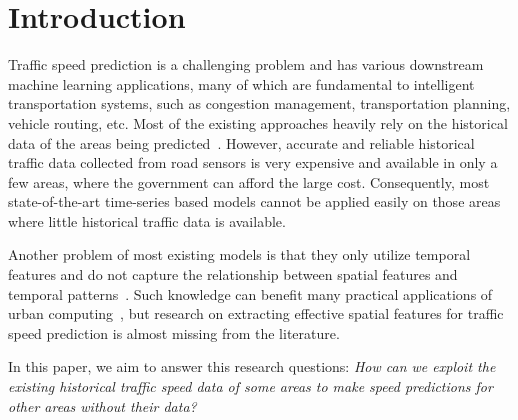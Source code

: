 \section{Introduction}
Traffic speed prediction is a challenging problem and has various downstream machine learning applications, many of which are fundamental to intelligent transportation systems, such as
congestion management, transportation planning,  vehicle routing, etc. \cite{Pan2012, Xu2015,Mchugh2015}
Most of the existing approaches heavily rely on the historical data of the areas being predicted~\cite{Ren2014,Clark2003Traffic}.
However, accurate and reliable historical traffic data collected from road sensors is very expensive and available in only a few areas, where the government can afford the large cost.
Consequently, most state-of-the-art time-series based models cannot be applied easily on those areas where little historical traffic data is available.

Another problem of most existing models is that they only utilize temporal features and do not capture the relationship between spatial features and temporal patterns~\cite{yao2017short,lin2017road}.
Such knowledge can benefit many practical applications of urban computing~\cite{zheng2014urban}, 
but research on extracting effective spatial features for traffic speed prediction is almost missing from the literature.

In this paper, we aim to answer this research questions:
\textit{ How can we exploit the existing historical traffic speed data of some areas to make speed predictions for other areas without their data?}


